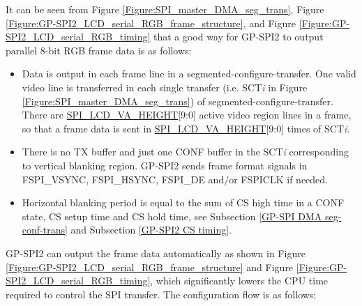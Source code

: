 \documentclass[main\_\_EN.tex]{subfiles}
\begin{document}
It can be seen from Figure \ref{Figure:SPI_master_DMA_seg_trans}, Figure \ref{Figure:GP-SPI2_LCD_serial_RGB_frame_structure}, and Figure \ref{Figure:GP-SPI2_LCD_serial_RGB_timing} that a good way for GP-SPI2 to output parallel 8-bit RGB frame data is as follows:

    \begin{itemize}
        \item Data is output in each frame line in a segmented-configure-transfer. One valid video line is transferred in each single transfer (i.e. SCT\textcolor{red}{\it{i}} in Figure \ref{Figure:SPI_master_DMA_seg_trans}) of segmented-configure-transfer. There are \hyperref[fielddesc:SPILCDVAHEIGHT]{SPI\_LCD\_VA\_HEIGHT}[9:0] active video region lines in a frame, so that a frame data is sent in \hyperref[fielddesc:SPILCDVAHEIGHT]{SPI\_LCD\_VA\_HEIGHT}[9:0] times of SCT\textcolor{red}{\it{i}}.

        \item There is no TX buffer and just one CONF buffer in the SCT\textcolor{red}{\it{i}} corresponding to vertical blanking region. GP-SPI2 sends frame format signals in FSPI\_VSYNC, FSPI\_HSYNC, FSPI\_DE and/or FSPICLK if needed.

        \item Horizontal blanking period is equal to the sum of CS high time in a CONF state, CS setup time and CS hold time, see Subsection \ref{GP-SPI DMA seg-conf-trans} and Subsection \ref{GP-SPI2 CS timing}.
    \end{itemize}



GP-SPI2 can output the frame data automatically as shown in Figure \ref{Figure:GP-SPI2_LCD_serial_RGB_frame_structure} and Figure \ref{Figure:GP-SPI2_LCD_serial_RGB_timing}, which significantly lowers the CPU time required to control the SPI transfer. The configuration flow is as follows:
\end{document}
